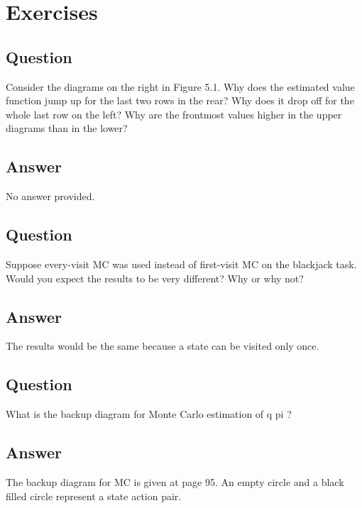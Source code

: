 \documentclass[11pt]{article}
\begin{document}
    \maketitle
    \setcounter{section}{4}


    \section{Exercises}

    \subsection{Question}
    Consider the diagrams on the right in Figure 5.1.
    Why does the estimated value function jump up for the last two rows in the rear?
    Why does it drop off for the whole last row on the left?
    Why are the frontmost values higher in the upper diagrams than in the lower?

    \subsection*{Answer}
    No answer provided.

    \subsection{Question}

    Suppose every-visit MC was used instead of first-visit MC on the blackjack task.
    Would you expect the results to be very different?
    Why or why not?

    \subsection*{Answer}

    The results would be the same because a state can be visited only once.

    \subsection{Question}

    What is the backup diagram for Monte Carlo estimation of q pi ?

    \subsection*{Answer}

    The backup diagram for MC is given at page 95.
    An empty circle and a black filled circle represent a state action pair.
\end{document}
